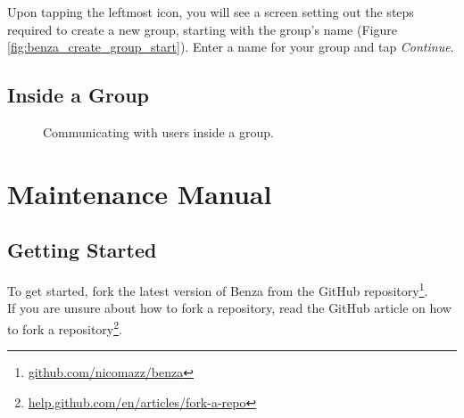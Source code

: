 \documentclass{article}
\begin{document}
    Upon tapping the leftmost icon, you will see a screen setting out the steps required to create a new group, starting with the group's name (Figure \ref{fig:benza_create_group_start}). Enter a name for your group and tap \emph{Continue}.
    
    \newpage
    \subsection{Inside a Group}
    
    \begin{figure}[ht]
    \caption{Communicating with users inside a group.}
    \end{figure}
    

\newpage
\section{Maintenance Manual}
\label{app:maintenancemanual}
    \subsection{Getting Started}
    To get started, fork the latest version of Benza from the GitHub repository\footnote{\href{https://github.com/nicomazz/benza}{github.com/nicomazz/benza}}. \\ [6pt]
        If you are unsure about how to fork a repository, read the GitHub article on how to fork a repository\footnote{\href{https://help.github.com/en/articles/fork-a-repo}{help.github.com/en/articles/fork-a-repo}}.
\end{document}
